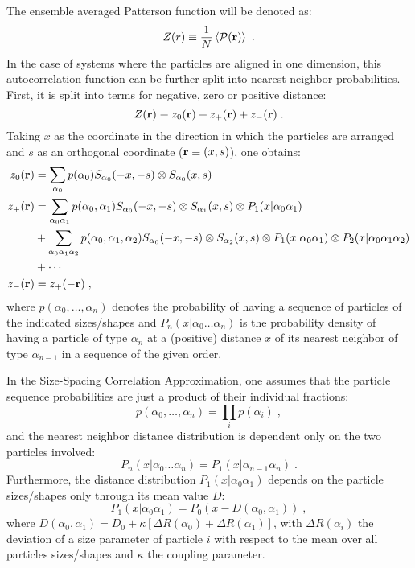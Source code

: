 The ensemble averaged Patterson function will be denoted as:
\begin{equation*}
  Z(r) \equiv \frac{1}{N}\left\langle \mathcal{P} (\mathbf{r} ) \right\rangle_{}  \; .
\end{equation*}
In the case of systems where the particles are aligned in one dimension, this autocorrelation function can be further split into nearest neighbor probabilities. First, it is split into terms for negative, zero or positive distance:
\begin{equation*}
  Z(\mathbf{r} ) \equiv z_0(\mathbf{r} ) + z_+(\mathbf{r} ) + z_-(\mathbf{r} ) \; .
\end{equation*}
Taking $x$ as the coordinate in the direction in which the particles are arranged and $s$ as an orthogonal coordinate ($\mathbf{r} \equiv (x,s)$), one obtains:
\begin{align*}
  z_0(\mathbf{r} ) &= \sum_{\alpha_0} p(\alpha_0) S_{\alpha_0}(-x,-s) \otimes S_{\alpha_0}(x,s)  \\
  z_+(\mathbf{r} ) &= \sum_{\alpha_0\alpha_1} p(\alpha_0,\alpha_1) S_{\alpha_0}(-x,-s) \otimes S_{\alpha_1}(x,s) \otimes P_1(x|\alpha_0\alpha_1)  \\
               &+ \sum_{\alpha_0\alpha_1\alpha_2} p(\alpha_0,\alpha_1,\alpha_2) S_{\alpha_0}(-x,-s) \otimes S_{\alpha_2}(x,s) \otimes P_1(x|\alpha_0\alpha_1) \otimes P_2(x|\alpha_0\alpha_1\alpha_2)  \\
               &+ \dotsb \\
  z_-(\mathbf{r} ) &= z_+(-\mathbf{r} ) \; ,
\end{align*}
where $p(\alpha_0,\dotsc ,\alpha_n)$ denotes the probability of having a sequence of particles of the indicated sizes/shapes and $P_n(x|\alpha_0\dotsc\alpha_n)$ is the probability density of having a particle of type $\alpha_n$ at a (positive) distance $x$ of its nearest neighbor of type $\alpha_{n-1}$ in a sequence of the given order.

In the Size-Spacing Correlation Approximation, one assumes that the particle sequence probabilities are just a product of their individual fractions:
\begin{equation*}
  p(\alpha_0,\dotsc ,\alpha_n) = \prod_i p(\alpha_i) \; ,
\end{equation*}
and the nearest neighbor distance distribution is dependent only on the two particles involved:
\begin{equation*}
  P_n(x|\alpha_0\dotsc\alpha_n) = P_1(x|\alpha_{n-1}\alpha_n) \; .
\end{equation*}
Furthermore, the distance distribution $P_1(x|\alpha_0\alpha_1)$ depends on the particle sizes/shapes only through its mean value $D$:
\begin{equation*}
  P_1(x|\alpha_0\alpha_1) = P_0(x - D(\alpha_0,\alpha_1) ) \; ,
\end{equation*}
where $D(\alpha_0,\alpha_1) = D_0 + \kappa \left[ \Delta R(\alpha_0) + \Delta R(\alpha_1) \right]$, with $\Delta R(\alpha_i)$ the deviation of a size parameter of particle $i$ with respect to the mean over all particles sizes/shapes and $\kappa$ the coupling parameter.


